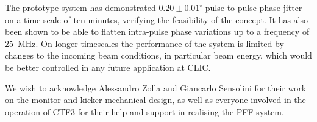 \documentclass[%
 reprint,
superscriptaddress,
 amsmath,amssymb,
 prl,
]{revtex4-1}
\begin{document}
The prototype system has demonstrated \(0.20\pm0.01^\circ\) pulse-to-pulse 
phase jitter on a time scale of ten minutes, verifying the feasibility of the 
concept. It has also been shown to be able 
to flatten intra-pulse phase variations up to a frequency of 25~MHz. On longer 
timescales the performance of the system is limited by changes to the incoming 
beam conditions, in particular beam energy, which would be better controlled in 
any future application at CLIC.

\begin{acknowledgments}
	We wish to acknowledge Alessandro Zolla and Giancarlo Sensolini 
	for their work on the monitor and kicker mechanical design,
	as well as everyone involved in the operation of CTF3 for their 
	help and support in realising the PFF system.
\end{acknowledgments}

\end{document}
